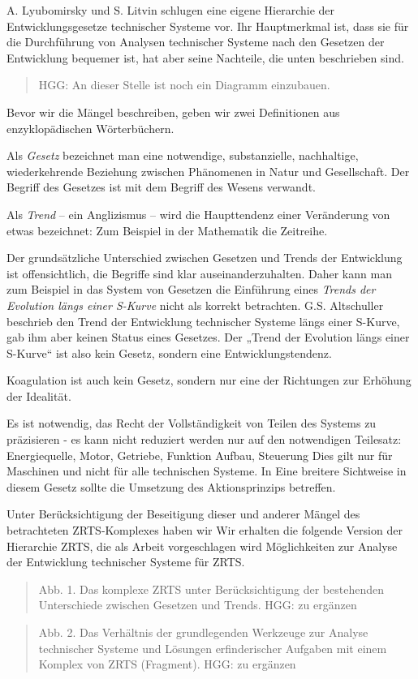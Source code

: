 \documentclass[11pt,a4paper]{article}
\begin{document}
A. Lyubomirsky und S. Litvin schlugen eine eigene Hierarchie der
Entwicklungsgesetze technischer Systeme vor. Ihr Hauptmerkmal ist, dass sie
für die Durchführung von Analysen technischer Systeme nach den Gesetzen der
Entwicklung bequemer ist, hat aber seine Nachteile, die unten beschrieben
sind.
\begin{quote}
  HGG: An dieser Stelle ist noch ein Diagramm einzubauen.
\end{quote}
Bevor wir die Mängel beschreiben, geben wir zwei Definitionen aus
enzyklopädischen Wörterbüchern.

Als \emph{Gesetz} bezeichnet man eine notwendige, substanzielle, nachhaltige,
wiederkehrende Beziehung zwischen Phänomenen in Natur und Gesellschaft. Der
Begriff des Gesetzes ist mit dem Begriff des Wesens verwandt.

Als \emph{Trend} -- ein Anglizismus -- wird die Haupttendenz einer Veränderung
von etwas bezeichnet: Zum Beispiel in der Mathematik die Zeitreihe.

Der grundsätzliche Unterschied zwischen Gesetzen und Trends der Entwicklung
ist offensichtlich, die Begriffe sind klar auseinanderzuhalten. Daher kann man
zum Beispiel in das System von Gesetzen die Einführung eines \emph{Trends der
  Evolution längs einer S-Kurve} nicht als korrekt betrachten.
G.S. Altschuller beschrieb den Trend der Entwicklung technischer Systeme längs
einer S-Kurve, gab ihm aber keinen Status eines Gesetzes. Der „Trend der
Evolution längs einer S-Kurve“ ist also kein Gesetz, sondern eine
Entwicklungstendenz.

Koagulation ist auch kein Gesetz, sondern nur eine der Richtungen zur Erhöhung
der Idealität.

Es ist notwendig, das Recht der Vollständigkeit von Teilen des Systems zu
präzisieren - es kann nicht reduziert werden nur auf den notwendigen
Teilesatz: Energiequelle, Motor, Getriebe, Funktion Aufbau, Steuerung Dies
gilt nur für Maschinen und nicht für alle technischen Systeme. In Eine
breitere Sichtweise in diesem Gesetz sollte die Umsetzung des Aktionsprinzips
betreffen.

Unter Berücksichtigung der Beseitigung dieser und anderer Mängel des
betrachteten ZRTS-Komplexes haben wir Wir erhalten die folgende Version der
Hierarchie ZRTS, die als Arbeit vorgeschlagen wird Möglichkeiten zur Analyse
der Entwicklung technischer Systeme für ZRTS.

\begin{quote}
  Abb. 1. Das komplexe ZRTS unter Berücksichtigung der bestehenden
  Unterschiede zwischen Gesetzen und Trends. HGG: zu ergänzen
\end{quote}
\begin{quote}
  Abb. 2. Das Verhältnis der grundlegenden Werkzeuge zur Analyse technischer
  Systeme und Lösungen erfinderischer Aufgaben mit einem Komplex von ZRTS
  (Fragment). HGG: zu ergänzen
\end{quote}
\end{document}

